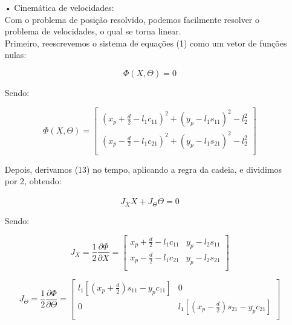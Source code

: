 \documentclass[12pt,a4paper]{article}
\begin{document}
\begin{itemize}
	\item[•] Cinemática de velocidades: \\
	
	Com o problema de posição resolvido, podemos facilmente resolver o problema de velocidades, o qual se torna linear. \\
	
	Primeiro, reescrevemos o sistema de equações (1) como um vetor de funções nulas:
	
	\begin{equation}
	\Phi (X, \Theta) = 0
	\end{equation}
	
	Sendo:
	
	\begin{equation}
	\Phi (X, \Theta) =
	\begin{bmatrix}
		(x_p +\frac{d}{2} - l_1 c_{11})^2 + (y_p - l_1 s_{11})^2 - l_2^2 \\
		(x_p -\frac{d}{2} - l_1 c_{21})^2 + (y_p - l_1 s_{21})^2 - l_2^2 \\
	\end{bmatrix}
	\end{equation}	 
	
	Depois, derivamos (13) no tempo, aplicando a regra da cadeia, e dividimos por 2, obtendo:
	
	\begin{equation}
	J_X \dot{X} + J_\Theta \dot{\Theta} = 0
	\end{equation}
	
	Sendo:
	
	\begin{equation}
	J_X = \frac{1}{2} \frac{\partial \Phi}{\partial X} =
	\begin{bmatrix}
	x_p + \frac{d}{2} - l_1 c_{11} & y_p - l_2 s_{11} \\
	x_p - \frac{d}{2} - l_1 c_{21} & y_p - l_2 s_{21} \\ 
	\end{bmatrix}
	\end{equation}
	
	\begin{equation}
	J_\Theta = \frac{1}{2} \frac{\partial \Phi}{\partial \Theta} =
	\begin{bmatrix}
	l_1 [ (x_p + \frac{d}{2} )s_{11} - y_p c_{11} ] & 0 \\
	0 & l_1 [ (x_p - \frac{d}{2} )s_{21} - y_p c_{21} ] \\	
	\end{bmatrix}
	\end{equation}
	

\end{itemize}
\end{document}
